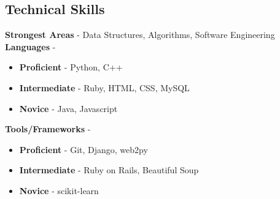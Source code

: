 \documentclass[margin, centered]{res}
\begin{document}
\begin{resume}
\section{Technical \hspace{2mm} Skills}
\textbf{Strongest Areas} - Data Structures, Algorithms, Software Engineering \\
\textbf{Languages} -
\begin{itemize}
	\item \textbf{Proficient} - Python, C++
	\item \textbf{Intermediate} - Ruby, HTML, CSS, MySQL
	\item \textbf{Novice} - Java, Javascript
\end{itemize} 
\textbf{Tools/Frameworks} -
\begin{itemize}
	\item \textbf{Proficient} - Git, Django, web2py
	\item \textbf{Intermediate} - Ruby on Rails, Beautiful Soup
	\item \textbf{Novice} - scikit-learn
\end{itemize} 



\end{resume}
\end{document}

